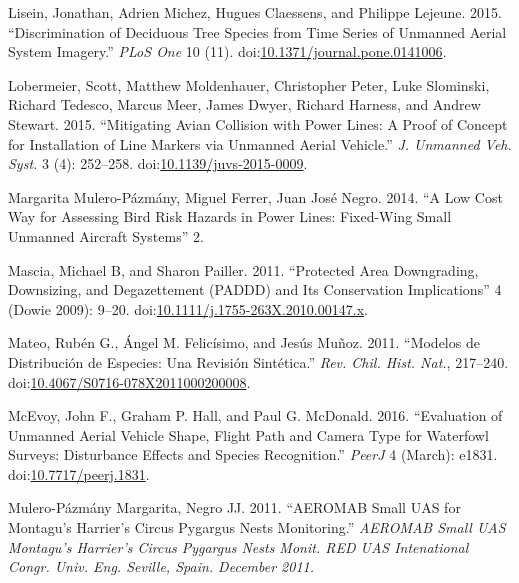 \documentclass[]{interact}
\theoremstyle{plain}%
\theoremstyle{definition}
\theoremstyle{remark}
\begin{document}
\hypertarget{ref-lisein_discrimination_2015}{}
Lisein, Jonathan, Adrien Michez, Hugues Claessens, and Philippe Lejeune.
2015. ``Discrimination of Deciduous Tree Species from Time Series of
Unmanned Aerial System Imagery.'' \emph{PLoS One} 10 (11).
doi:\href{https://doi.org/10.1371/journal.pone.0141006}{10.1371/journal.pone.0141006}.

\hypertarget{ref-lobermeier_mitigating_2015}{}
Lobermeier, Scott, Matthew Moldenhauer, Christopher Peter, Luke
Slominski, Richard Tedesco, Marcus Meer, James Dwyer, Richard Harness,
and Andrew Stewart. 2015. ``Mitigating Avian Collision with Power Lines:
A Proof of Concept for Installation of Line Markers via Unmanned Aerial
Vehicle.'' \emph{J. Unmanned Veh. Syst.} 3 (4): 252--258.
doi:\href{https://doi.org/10.1139/juvs-2015-0009}{10.1139/juvs-2015-0009}.

\hypertarget{ref-margarita_mulero-pazmany_juan_jose_negro_low_2014}{}
Margarita Mulero-Pázmány, Miguel Ferrer, Juan José Negro. 2014. ``A Low
Cost Way for Assessing Bird Risk Hazards in Power Lines: Fixed-Wing
Small Unmanned Aircraft Systems'' 2.

\hypertarget{ref-mascia_protected_2011}{}
Mascia, Michael B, and Sharon Pailler. 2011. ``Protected Area
Downgrading, Downsizing, and Degazettement (PADDD) and Its Conservation
Implications'' 4 (Dowie 2009): 9--20.
doi:\href{https://doi.org/10.1111/j.1755-263X.2010.00147.x}{10.1111/j.1755-263X.2010.00147.x}.

\hypertarget{ref-mateo_modelos_2011}{}
Mateo, Rubén G., Ángel M. Felicísimo, and Jesús Muñoz. 2011. ``Modelos
de Distribución de Especies: Una Revisión Sintética.'' \emph{Rev. Chil.
Hist. Nat.}, 217--240.
doi:\href{https://doi.org/10.4067/S0716-078X2011000200008}{10.4067/S0716-078X2011000200008}.

\hypertarget{ref-mcevoy_evaluation_2016}{}
McEvoy, John F., Graham P. Hall, and Paul G. McDonald. 2016.
``Evaluation of Unmanned Aerial Vehicle Shape, Flight Path and Camera
Type for Waterfowl Surveys: Disturbance Effects and Species
Recognition.'' \emph{PeerJ} 4 (March): e1831.
doi:\href{https://doi.org/10.7717/peerj.1831}{10.7717/peerj.1831}.

\hypertarget{ref-mulero-pazmany_margarita_aeromab_2011}{}
Mulero-Pázmány Margarita, Negro JJ. 2011. ``AEROMAB Small UAS for
Montagu's Harrier's Circus Pygargus Nests Monitoring.'' \emph{AEROMAB
Small UAS Montagu's Harrier's Circus Pygargus Nests Monit. RED UAS
Intenational Congr. Univ. Eng. Seville, Spain. December 2011.}
\end{document}

